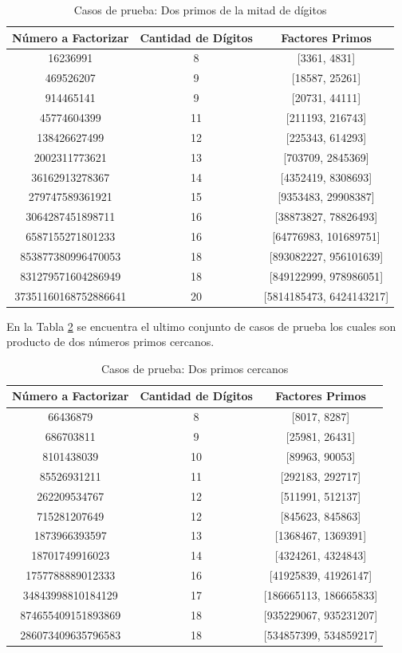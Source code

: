 \begin{table}[H]
    \centering
    \begin{tabular}{|c|c|c|}
    \hline
    Número a Factorizar & Cantidad de Dígitos & Factores Primos \\
    \hline
    16236991 & 8 & [3361, 4831] \\
    469526207 & 9 & [18587, 25261] \\
    914465141 & 9 & [20731, 44111] \\
    45774604399 & 11 & [211193, 216743] \\
    138426627499 & 12 & [225343, 614293] \\
    2002311773621 & 13 & [703709, 2845369] \\
    36162913278367 & 14 & [4352419, 8308693] \\
    279747589361921 & 15 & [9353483, 29908387] \\
    3064287451898711 & 16 & [38873827, 78826493] \\
    6587155271801233 & 16 & [64776983, 101689751] \\
    853877380996470053 & 18 & [893082227, 956101639] \\
    831279571604286949 & 18 & [849122999, 978986051] \\
    37351160168752886641 & 20 & [5814185473, 6424143217] \\
    \hline
    \end{tabular}
    \caption{Casos de prueba: Dos primos de la mitad de dígitos}
    \label{tabla:factores_mitad}
    \end{table}
    

En la Tabla \ref{tabla:primos_cercanos} se encuentra el ultimo conjunto de casos de prueba los cuales son producto de dos números primos cercanos.

\begin{table}[H]
    \centering
    \begin{tabular}{|c|c|c|}
    \hline
    Número a Factorizar & Cantidad de Dígitos & Factores Primos \\
    \hline
66436879 & 8 & [8017, 8287] \\
686703811 & 9 & [25981, 26431] \\
8101438039 & 10 & [89963, 90053] \\
85526931211 & 11 & [292183, 292717] \\
262209534767 & 12 & [511991, 512137] \\
715281207649 & 12 & [845623, 845863] \\
1873966393597 & 13 & [1368467, 1369391] \\
18701749916023 & 14 & [4324261, 4324843] \\
1757788889012333 & 16 & [41925839, 41926147] \\
34843998810184129 & 17 & [186665113, 186665833] \\
874655409151893869 & 18 & [935229067, 935231207] \\
286073409635796583 & 18 & [534857399, 534859217] \\
    \hline
    \end{tabular}
    \caption{Casos de prueba: Dos primos cercanos}
    \label{tabla:primos_cercanos}
    \end{table}
    

